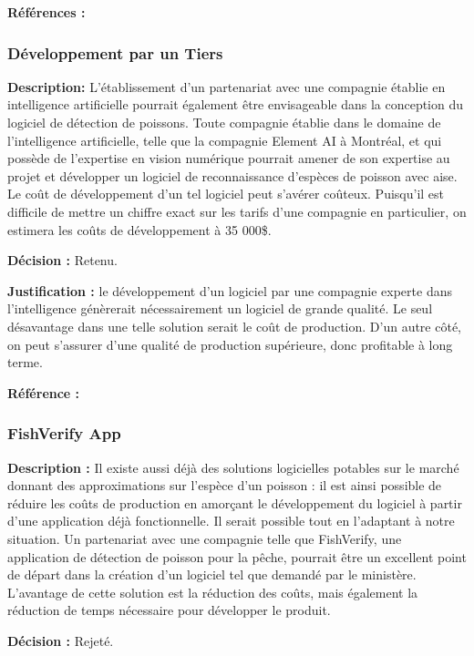 \textbf{Références :} \cite{requinage}


\subsubsection{Développement par un Tiers}

\textbf{Description: }L’établissement d’un partenariat avec une compagnie établie en intelligence artificielle pourrait également être envisageable dans la conception du logiciel de détection de poissons. Toute compagnie établie dans le domaine de l’intelligence artificielle, telle que la compagnie Element AI à Montréal, et qui possède de l’expertise en vision numérique pourrait amener de son expertise au projet et développer un logiciel de reconnaissance d’espèces de poisson avec aise. Le coût de développement d’un tel logiciel peut s’avérer coûteux. Puisqu’il est difficile de mettre un chiffre exact sur les tarifs d’une compagnie en particulier, on estimera les coûts de développement à  35 000\$.

\textbf{Décision :} Retenu.

\textbf{Justification :} le développement d’un logiciel par une compagnie experte dans l’intelligence génèrerait nécessairement un logiciel de grande qualité. Le seul désavantage dans une telle solution serait le coût de production. D’un autre côté, on peut s’assurer d’une qualité de production supérieure, donc profitable à long terme.

\textbf{Référence :} \cite{elementai}


\subsubsection{FishVerify App}

\textbf{Description :} Il existe aussi déjà des solutions logicielles potables sur le marché donnant des approximations sur l’espèce d’un poisson : il est ainsi possible de réduire les coûts de production en amorçant le développement du logiciel à partir d’une application déjà fonctionnelle. Il serait possible tout en l’adaptant à notre situation. Un partenariat avec une compagnie telle que FishVerify, une application de détection de poisson pour la pêche, pourrait être un excellent point de départ dans la création d’un logiciel tel que demandé par le ministère. L’avantage de cette solution est la réduction des coûts, mais également la réduction de temps nécessaire pour développer le produit.

\textbf{Décision :} Rejeté.


